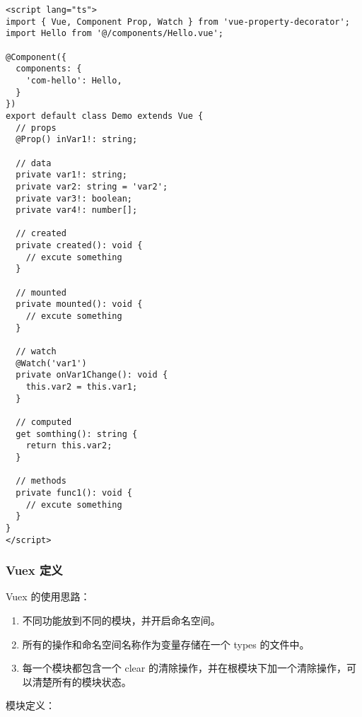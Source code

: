 \begin{lstlisting}
<script lang="ts">
import { Vue, Component Prop, Watch } from 'vue-property-decorator';
import Hello from '@/components/Hello.vue';

@Component({
  components: {
    'com-hello': Hello,
  }
})
export default class Demo extends Vue {
  // props
  @Prop() inVar1!: string;

  // data
  private var1!: string;
  private var2: string = 'var2';
  private var3!: boolean;
  private var4!: number[];

  // created
  private created(): void {
    // excute something
  }

  // mounted
  private mounted(): void {
    // excute something
  }

  // watch
  @Watch('var1')
  private onVar1Change(): void {
    this.var2 = this.var1;
  }

  // computed
  get somthing(): string {
    return this.var2;
  }

  // methods
  private func1(): void {
    // excute something
  }
}
</script>
\end{lstlisting}

\subsubsection{Vuex 定义}\label{vuex-ux5b9aux4e49}

Vuex 的使用思路：

\begin{enumerate}
\def\labelenumi{\arabic{enumi}.}
\tightlist
\item
  不同功能放到不同的模块，并开启命名空间。
\item
  所有的操作和命名空间名称作为变量存储在一个 types 的文件中。
\item
  每一个模块都包含一个 clear
  的清除操作，并在根模块下加一个清除操作，可以清楚所有的模块状态。
\end{enumerate}

模块定义：

